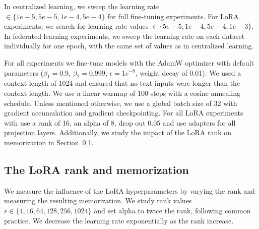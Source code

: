 In centralized learning, we sweep the learning rate $\in \{1e-5, 5e-5, 1e-4, 5e-4\}$ for full fine-tuning experiments. For LoRA experiments, we search for learning rate values $\in \{5e-5, 1e-4, 5e-4, 1e-3\}$. In federated learning experiments, we sweep the learning rate on each dataset individually for one epoch, with the same set of values as in centralized learning.

For all experiments we fine-tune models with the AdamW optimizer \citep{loshchilov2019adamw} with default parameters ($\beta_1=0.9$, $\beta_2=0.999$, $\epsilon=1e^{-8}$, weight decay of 0.01). We used a context length of 1024 and ensured that no text inputs were longer than the context length. We use a linear warmup of 100 steps with a cosine annealing schedule. Unless mentioned otherwise, we use a global batch size of 32 with gradient accumulation and gradient checkpointing. For all LoRA experiments with use a rank of 16, an alpha of 8, drop out 0.05 and use adapters for all projection layers. Additionally, we study the impact of the LoRA rank on memorization in Section~\ref{sec:lora_rank}.

\subsection{The LoRA rank and memorization}
\label{sec:lora_rank}

We measure the influence of the LoRA hyperparameters by varying the rank and measuring the resulting memorization. We study rank values $ r \in \{4, 16, 64, 128, 256, 1024\}$ and set alpha to twice the rank, following common practice. We decrease the learning rate exponentially as the rank increase.


